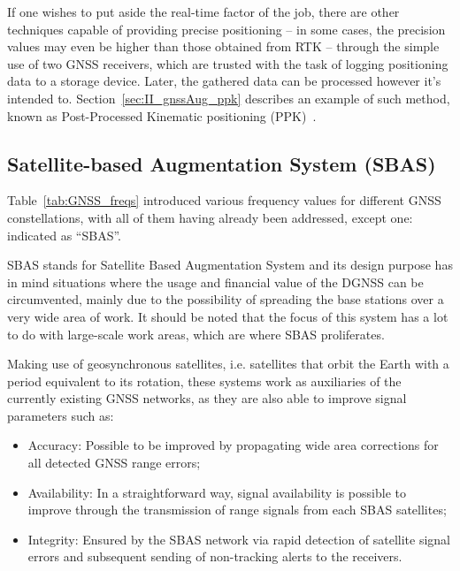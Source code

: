 If one wishes to put aside the real-time factor of the job, there are other techniques capable of providing precise positioning -- in some cases, the precision values may even be higher than those obtained from RTK -- through the simple use of two GNSS receivers, which are trusted with the task of logging positioning data to a storage device. Later, the gathered data can be processed however it's intended to. Section~\ref{sec:II_gnssAug_ppk} describes an example of such method, known as Post-Processed Kinematic positioning (PPK)~\cite{novatel_gnss,kaplan_2017,groves_2008}.

\subsection{Satellite-based Augmentation System (SBAS)}\label{sec:II_gnssAug_sbas}

Table~\ref{tab:GNSS_freqs} introduced various frequency values for different GNSS constellations, with all of them having already been addressed, except one: indicated as ``SBAS''.

SBAS stands for Satellite Based Augmentation System and its design purpose has in mind situations where the usage and financial value of the DGNSS can be circumvented, mainly due to the possibility of spreading the base stations over a very wide area of work. It should be noted that the focus of this system has a lot to do with large-scale work areas, which are where SBAS proliferates.

Making use of geosynchronous satellites, i.e. satellites that orbit the Earth with a period equivalent to its rotation, these systems work as auxiliaries of the currently existing GNSS networks, as they are also able to improve signal parameters such as:
\begin{itemize}
    \item Accuracy: Possible to be improved by propagating wide area corrections for all detected GNSS range errors;
    \item Availability: In a straightforward way, signal availability is possible to improve through the transmission of range signals from each SBAS satellites;
    \item Integrity: Ensured by the SBAS network via rapid detection of satellite signal errors and subsequent sending of non-tracking alerts to the receivers.
\end{itemize}

